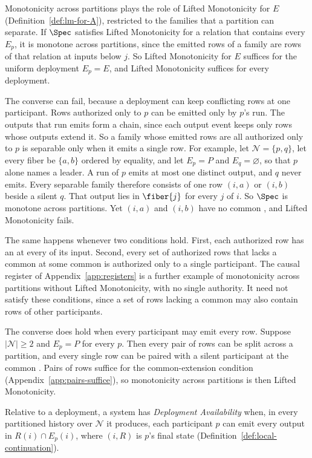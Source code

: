 Monotonicity across partitions plays the role of Lifted Monotonicity for $E$
(Definition~\ref{def:lm-for-A}), restricted to the families that a partition
can separate.  If $\Spec$ satisfies Lifted Monotonicity for a relation that
contains every $E_p$, it is monotone across partitions, since the emitted rows
of a family are rows of that relation at inputs below $j$.  So Lifted
Monotonicity for $E$ suffices for the uniform deployment $E_p=E$, and Lifted
Monotonicity suffices for every deployment.

The converse can fail, because a deployment can keep conflicting rows at one
participant.  Rows authorized only to $p$ can be emitted only by $p$'s run.
The outputs that run emits form a chain, since each output event keeps only
rows whose outputs extend it.  So a family whose emitted rows are all
authorized only to $p$ is separable only when it emits a single row.  For
example, let $\mathcal N=\{p,q\}$, let every fiber be $\{a,b\}$ ordered by
equality, and let $E_p=P$ and $E_q=\varnothing$, so that $p$ alone names a
leader.  A run of $p$ emits at most one distinct output, and $q$ never emits.
Every separable family therefore consists of one row $(i,a)$ or $(i,b)$ beside
a silent $q$.  That output lies in $\fiber{j}$ for every \indesc $j$ of $i$.
So $\Spec$ is monotone across partitions.  Yet $(i,a)$ and $(i,b)$ have no
common \outnoun, and Lifted Monotonicity fails.

The same happens whenever two conditions hold.  First, each authorized row has
an \outnoun at every \indesc of its input.  Second, every set of authorized
rows that lacks a common \outnoun at some common \indesc is authorized only to
a single participant.  The causal register of Appendix~\ref{app:registers} is
a further example of monotonicity across partitions without Lifted
Monotonicity, with no single authority.  It need not satisfy these conditions,
since a set of rows lacking a common \outnoun may also contain rows of other
participants.

The converse does hold when every participant may emit every row.  Suppose
$|\mathcal N|\ge2$ and $E_p=P$ for every $p$.  Then every pair of rows can be
split across a partition, and every single row can be paired with a silent
participant at the common \indesc.  Pairs of rows suffice for the
common-extension condition (Appendix~\ref{app:pairs-suffice}), so
monotonicity across partitions is then Lifted Monotonicity.

\begin{definition}
\label{def:deployment-availability}
Relative to a deployment, a system has \emph{Deployment Availability} when, in
every partitioned history over $\mathcal N$ it produces, each participant $p$
can emit every output in $R(i)\cap E_p(i)$, where $(i,R)$ is $p$'s final state
(Definition~\ref{def:local-continuation}).
\end{definition}


